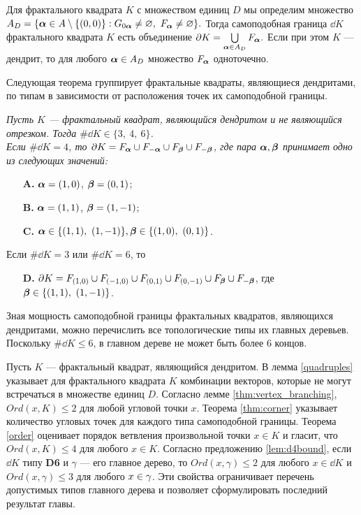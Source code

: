 Для фрактального квадрата $K$ с множеством единиц $D$ мы определим множество 
$A_D=\{{\bm{\alpha}}\in A\setminus\{(0,0)\}: G_{0{\bm{\alpha}}}\neq\varnothing,\ F_{\bm{\alpha}}\neq\varnothing\}.$
Тогда самоподобная граница $\dd K$ фрактального квадрата $K$ есть объединение
$\partial K=\bigcup\limits_{{\bm{\alpha}}\in A_D}F_{\bm{\alpha}}.$
Если при этом $K$ --- дендрит, то для любого ${\bm{\alpha}}\in A_D$ множество $F_{\bm{\alpha}}$ одноточечно.

Следующая теорема группирует фрактальные квадраты, являющиеся дендритами, по типам в зависимости от расположения точек их самоподобной границы.\\

{\em Пусть $K$ --- фрактальный квадрат, являющийся дендритом и не являющийся отрезком.
Тогда $\#\dd K\in\{3,\ 4,\ 6\}$. \\
Если $\#\dd K=4$, то  $\partial K=F_{\bm{\alpha}}\cup F_{-{\bm{\alpha}}}\cup F_{\bm{\beta}}\cup F_{-{\bm{\beta}}}$, где   пара  ${\bm{\alpha}},{\bm{\beta}}$ принимает одно из следующих значений:
	\begin{itemize}[nolistsep]
	\item[{\bf A.}] ${\bm{\alpha}}=(1,0)$, $ {\bm{\beta}}=(0,1)$;
	\item[{\bf B.}] ${\bm{\alpha}}=(1,1)$, $ {\bm{\beta}}=(1,-1)$;
	\item[{\bf C.}] $\bma\in\{(1,1),\ (1,-1)\},\bmb\in\{(1,0),\ (0,1)\}$.
	\end{itemize}
Если $\#\dd K=3$ или $\#\dd K=6$, то 
\begin{itemize}[nolistsep]
	\item[{\bf D.}] $\partial K=F_{(1,0)}\cup F_{(-1,0)}\cup F_{(0,1)}\cup F_{(0,-1)}\cup F_{\bm{\beta}}\cup F_{-{\bm{\beta}}}$, где ${\bm{\beta}}\in\{(1,1),\ (1,-1)\}$.
\end{itemize}\quad}

Зная мощность самоподобной границы фрактальных квадратов, являющихся дендритами, можно перечислить все топологические типы их главных деревьев.
Поскольку $\#\dd K\leq6$, в главном дереве не может быть более 6 концов.

Пусть $K$ --- фрактальный квадрат, являющийся дендритом.
В лемма \ref{quadruples} указывает для фрактального квадрата $K$ комбинации векторов, которые не могут встречаться в множестве единиц $D$.
Согласно лемме \ref{thm:vertex_branching}, $Ord(x,K)\leq 2$ для любой угловой точки $x$.
Теорема \ref{thm:corner} указывает количество угловых точек для каждого типа самоподобной границы.
Теорема \ref{order} оценивает порядок ветвления произвольной точки $x\in K$ и гласит, что $Ord(x,K)\leq 4$ для любого $x\in K$.
Согласно предложению \ref{lem:d4bound}, если $\dd K$ типу {\bf D6} и $\gamma$ --- его главное дерево, то $Ord(x,\gamma)\leq2$ для любого $x\in\dd K$ и $Ord(x,\gamma)\leq3$ для любого $x\in\gamma$.
Эти свойства ограничивает перечень допустимых типов главного дерева и позволяет сформулировать последний результат главы.\\

